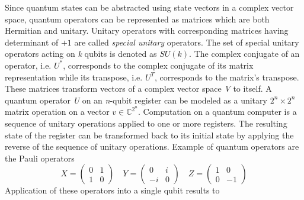 Since quantum states can be abstracted using state vectors in a complex vector space, quantum operators can be represented as matrices which are both Hermitian and unitary. Unitary operators with corresponding matrices having determinant of $+1$ are called \textit{special unitary} operators. The set of special unitary operators acting on \textit{k} qubits is denoted as $SU(k)$. The complex conjugate of an operator, i.e. $U^*$, corresponds to the complex conjugate of its matrix representation while its transpose, i.e. $U^T$, corresponds to the matrix's transpose. These matrices transform vectors of a complex vector space \textit{V} to itself. A quantum operator \textit{U} on an \textit{n}-qubit register can be modeled as a unitary $2^n \times 2^n$ matrix operation on a vector $v \in \mathbb{C}^{2^n}$. Computation on a quantum computer is a sequence of unitary operations applied to one or more registers. The resulting state of the register can be transformed back to its initial state by applying the reverse of the sequence of unitary operations. Example of quantum operators are the Pauli operators 
\begin{equation*}
	X = 
	\begin{pmatrix}
		0	&	1\\
		1	&	0
	\end{pmatrix}
	\quad
	Y = 
	\begin{pmatrix}
		0	&	i\\
		-i	&	0
	\end{pmatrix}
	\quad
	Z = 
	\begin{pmatrix}
		1	&	0\\
		0	&	-1
	\end{pmatrix}
\end{equation*}
Application of these operators into a single qubit results to
